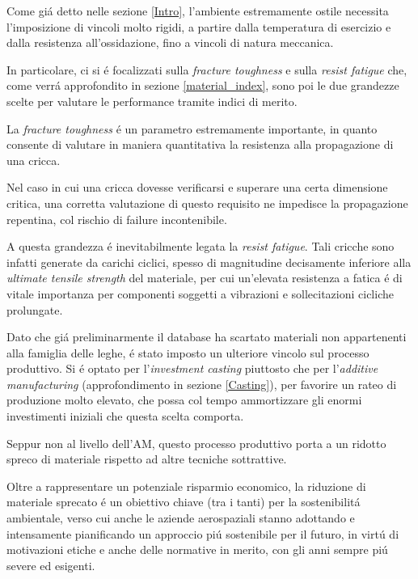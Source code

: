 \documentclass{article}
\begin{document}
    Come giá detto nelle sezione \ref{Intro}, l'ambiente estremamente ostile necessita l'imposizione di vincoli molto 
    rigidi, a partire dalla temperatura di esercizio e dalla resistenza all'ossidazione, fino a vincoli di natura
    meccanica.

    In particolare, ci si é focalizzati sulla \textit{fracture toughness} e sulla \textit{resist fatigue} che, 
    come verrá approfondito in sezione \ref{material_index}, sono poi le due grandezze scelte per valutare le performance
    tramite indici di merito.

    La \textit{fracture toughness} é un parametro estremamente importante, in quanto consente di valutare in maniera quantitativa
    la resistenza alla propagazione di una cricca. 
    
    Nel caso in cui una cricca dovesse verificarsi e superare una certa dimensione critica, una corretta valutazione
    di questo requisito ne impedisce la propagazione repentina, col rischio di failure incontenibile.

    A questa grandezza é inevitabilmente legata la \textit{resist fatigue}. Tali cricche sono infatti generate da carichi ciclici,
    spesso di magnitudine decisamente inferiore alla \textit{ultimate tensile strength} del materiale, per cui un'elevata
    resistenza a fatica é di vitale importanza per componenti soggetti a vibrazioni e sollecitazioni cicliche prolungate.

    Dato che giá preliminarmente il database ha scartato materiali non appartenenti alla famiglia delle leghe, é stato imposto
    un ulteriore vincolo sul processo produttivo. Si é optato per l'\textit{investment casting} piuttosto che per 
    l'\textit{additive manufacturing} (approfondimento in sezione \ref{Casting}), per favorire un rateo di produzione molto elevato, che possa col tempo ammortizzare
    gli enormi investimenti iniziali che questa scelta comporta.

    Seppur non al livello dell'AM, questo processo produttivo porta a un ridotto spreco di materiale
    rispetto ad altre tecniche sottrattive. 

    Oltre a rappresentare un potenziale risparmio economico, la riduzione di materiale sprecato é un obiettivo
    chiave (tra i tanti) per la sostenibilitá ambientale, verso cui anche le aziende aerospaziali stanno 
    adottando e intensamente pianificando un approccio piú sostenibile per il futuro, in virtú di motivazioni etiche
    e anche delle normative in merito, con gli anni sempre piú severe ed esigenti.
\end{document}
